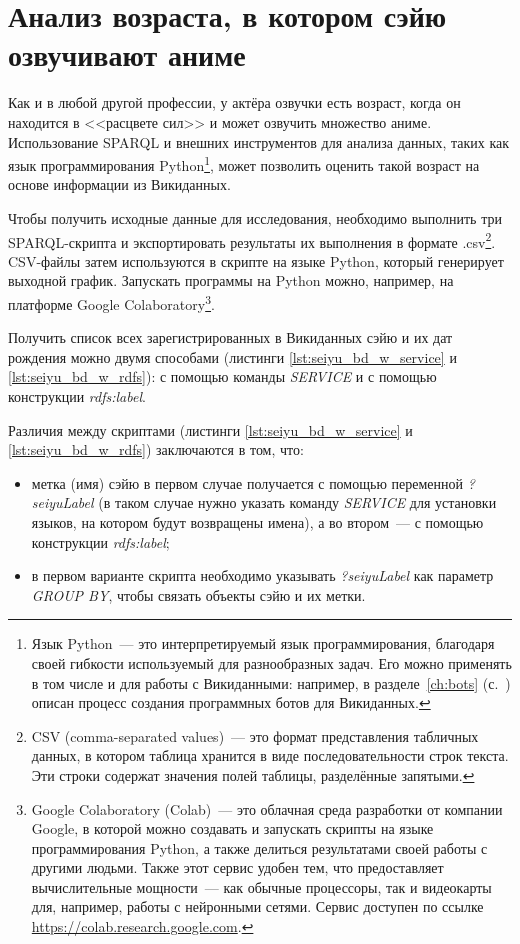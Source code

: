 \section{Анализ возраста, в котором сэйю озвучивают аниме}

Как и в любой другой профессии, у актёра озвучки есть возраст, когда он находится в <<расцвете сил>> и может озвучить множество аниме. Использование SPARQL и внешних инструментов для анализа данных, таких как язык программирования Python\footnote{Язык Python~--- это интерпретируемый язык программирования, благодаря своей гибкости используемый для разнообразных задач. Его можно применять в том числе и для работы с Викиданными: например, в разделе~\ref{ch:bots} (с.~\pageref{ch:bots}) описан процесс создания программных ботов для Викиданных.}, может позволить оценить такой возраст на основе информации из Викиданных.

Чтобы получить исходные данные для исследования, необходимо выполнить три SPARQL-скрипта и экспортировать результаты их выполнения в формате .csv\footnote{CSV (comma-separated values)~--- это формат представления табличных данных, в котором таблица хранится в виде последовательности строк текста. Эти строки содержат значения полей таблицы, разделённые запятыми.}. CSV-файлы затем используются в скрипте на языке Python, который генерирует выходной график. Запускать программы на Python можно, например, на платформе Google Colaboratory\footnote{Google Colaboratory (Colab)~--- это облачная среда разработки от компании Google, в которой можно создавать и запускать скрипты на языке программирования Python, а также делиться результатами своей работы с другими людьми. Также этот сервис удобен тем, что предоставляет вычислительные мощности~--- как обычные процессоры, так и видеокарты для, например, работы с нейронными сетями. Сервис доступен по ссылке \href{https://colab.research.google.com}{https://colab.research.google.com}.}.

Получить список всех зарегистрированных в Викиданных сэйю и их дат рождения можно двумя способами (листинги \protect\ref{lst:seiyu_bd_w_service} и \protect\ref{lst:seiyu_bd_w_rdfs}): с помощью команды \emph{SERVICE} и с помощью конструкции \emph{rdfs:label}.

Различия между скриптами (листинги \protect\ref{lst:seiyu_bd_w_service} и \protect\ref{lst:seiyu_bd_w_rdfs}) заключаются в том, что:

\begin{itemize}
    \item метка (имя) сэйю в первом случае получается с помощью переменной \emph{?seiyuLabel} (в таком случае нужно указать команду \emph{SERVICE} для установки языков, на котором будут возвращены имена), а во втором~--- с помощью конструкции \emph{rdfs:label};
    \item в первом варианте скрипта необходимо указывать \emph{?seiyuLabel} как параметр \emph{GROUP BY}, чтобы связать объекты сэйю и их метки.
\end{itemize}

